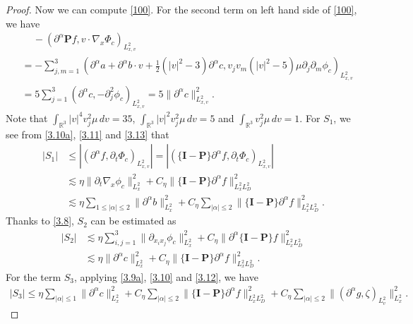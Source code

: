 \documentclass[reqno,a4paper]{amsart}
\numberwithin{equation}{section}
\newcommand{\1}{\mathbf{1}}
\newcommand{\R}{\mathbb{R}}
\renewcommand{\P}{\mathbf{P}}
\newcommand{\<}{\langle}
\renewcommand{\>}{\rangle}
\newcommand{\I}{\mathbf{I}}
\renewcommand{\P}{\mathbf{P}}
\begin{document}
\begin{proof}
		Now we can compute \eqref{100}. For the second term on left hand side of \eqref{100}, we have 
		\begin{align*}
			&\quad\,-({\partial^\alpha \P f},v\cdot{\nabla_{x}\Phi_{c}})_{L^2_{x,v}} \\
			&= -\sum_{j,m=1}^3({\partial^\alpha a}+{\partial^\alpha b}\cdot v+\frac{1}{2}(|v|^2-3){\partial^\alpha c} ,v_jv_m(|v|^2-5)\mu{\partial_j\partial_m\phi_{c}})_{L^2_{x,v}} \\
			&= 5\sum_{j=1}^3({\partial^\alpha c} ,{-\partial^2_j\phi_{c}})_{L^2_{x,v}}  = 5\|{\partial^\alpha c}\|^2_{L^2_{x,v}} .
		\end{align*}
	Note that $\int_{\R^3}|v|^4v^2_j\mu\,dv=35$, $\int_{\R^3}|v|^2v^2_j\mu\,dv=5$ and  $\int_{\R^3}v^2_j\mu\,dv=1$.  
		For $S_1$, we see from \eqref{3.10a}, \eqref{3.11} and \eqref{3.13} that 
		\begin{align*}
			|S_1|&\le|({\partial^\alpha f},\partial_t{\Phi_c})_{L^2_{x,v}}| = |(\{\I-\P\}{\partial^\alpha f},\partial_t{\Phi_c})_{L^2_{x,v}}|\\
			&\lesssim \eta\|\partial_t{\nabla_x\phi_c}\|^2_{L^2_{x}}+C_\eta\|\{\I-\P\}{\partial^\alpha f}\|^2_{L^2_{x}L^2_D}\\
			&\lesssim \eta
			\sum_{1\le|\alpha|\le2}\|\partial^\alpha b\|^2_{L^2_{x}}+C_\eta\sum_{|\alpha|\le 2}\|\{\I-\P\}{\partial^\alpha f}\|^2_{L^2_{x}L^2_D}.
		\end{align*}
		Thanks to \eqref{3.8}, $S_2$ can be estimated as 
		\begin{align*}
			|S_2|&\lesssim \eta\sum_{i,j=1}^3\|\partial_{x_ix_j}\phi_c\|_{L^2_x}^2+C_\eta\|\partial^\alpha\{\I-\P\}f\|^2_{L^2_xL^2_D}\\&\lesssim \eta\|{\partial^\alpha c}\|^2_{L^2_{x}}+C_\eta\|\{\I-\P\}{\partial^\alpha f}\|^2_{L^2_{x}L^2_D}.
		\end{align*}
		For the term $S_3$, applying \eqref{3.9a}, \eqref{3.10} and \eqref{3.12}, we have 
		\begin{align*}
			|S_3|\le \eta\sum_{|\alpha|\le 1}\|{\partial^\alpha c}\|^2_{L^2_{x}}+C_\eta\sum_{|\alpha|\le 2}\|\{\I-\P\}{\partial^\alpha f}\|^2_{L^2_{x}L^2_D}+C_\eta\sum_{|\alpha|\le 2}\|({\partial^\alpha g},\zeta)_{L^2_v}\|^2_{L^2_{x}}.

\end{align*}
\end{proof}
\end{document}
